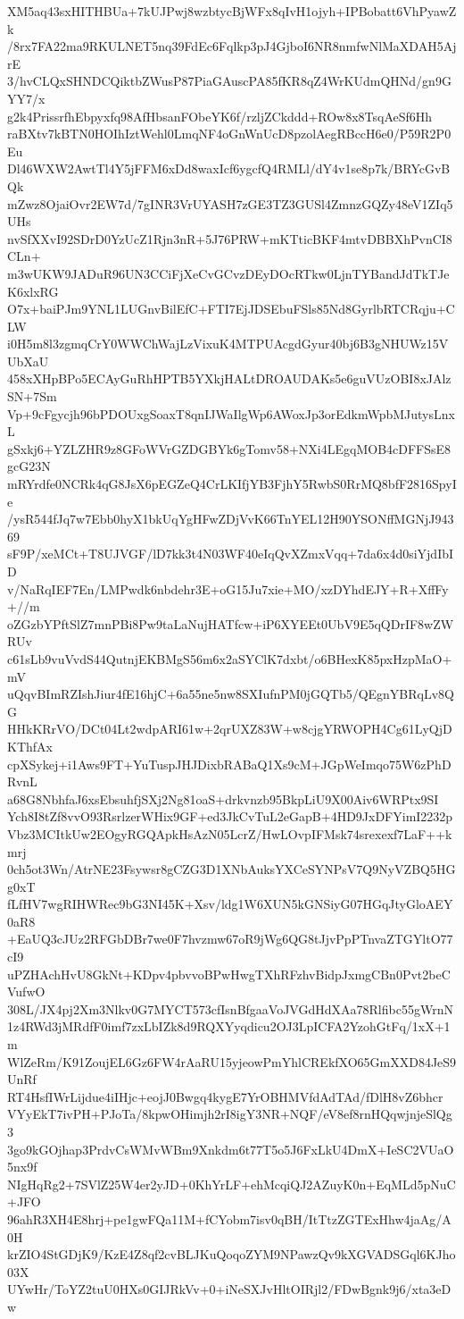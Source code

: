 XM5aq43sxHITHBUa+7kUJPwj8wzbtycBjWFx8qIvH1ojyh+IPBobatt6VhPyawZk
/8rx7FA22ma9RKULNET5nq39FdEc6Fqlkp3pJ4GjboI6NR8nmfwNlMaXDAH5AjrE
3/hvCLQxSHNDCQiktbZWusP87PiaGAuscPA85fKR8qZ4WrKUdmQHNd/gn9GYY7/x
g2k4PrissrfhEbpyxfq98AfHbsanFObeYK6f/rzljZCkddd+ROw8x8TsqAeSf6Hh
raBXtv7kBTN0HOIhIztWehl0LmqNF4oGnWnUcD8pzolAegRBccH6e0/P59R2P0Eu
Dl46WXW2AwtTl4Y5jFFM6xDd8waxIcf6ygcfQ4RMLl/dY4v1se8p7k/BRYcGvBQk
mZwz8OjaiOvr2EW7d/7gINR3VrUYASH7zGE3TZ3GUSl4ZmnzGQZy48eV1ZIq5UHs
nvSfXXvI92SDrD0YzUcZ1Rjn3nR+5J76PRW+mKTticBKF4mtvDBBXhPvnCI8CLn+
m3wUKW9JADuR96UN3CCiFjXeCvGCvzDEyDOcRTkw0LjnTYBandJdTkTJeK6xlxRG
O7x+baiPJm9YNL1LUGnvBilEfC+FTI7EjJDSEbuFSls85Nd8GyrlbRTCRqju+CLW
i0H5m8l3zgmqCrY0WWChWajLzVixuK4MTPUAcgdGyur40bj6B3gNHUWz15VUbXaU
458xXHpBPo5ECAyGuRhHPTB5YXkjHALtDROAUDAKs5e6guVUzOBI8xJAlzSN+7Sm
Vp+9cFgycjh96bPDOUxgSoaxT8qnIJWaIlgWp6AWoxJp3orEdkmWpbMJutysLnxL
gSxkj6+YZLZHR9z8GFoWVrGZDGBYk6gTomv58+NXi4LEgqMOB4cDFFSsE8gcG23N
mRYrdfe0NCRk4qG8JsX6pEGZeQ4CrLKIfjYB3FjhY5RwbS0RrMQ8bfF2816SpyIe
/ysR544fJq7w7Ebb0hyX1bkUqYgHFwZDjVvK66TnYEL12H90YSONffMGNjJ94369
sF9P/xeMCt+T8UJVGF/lD7kk3t4N03WF40eIqQvXZmxVqq+7da6x4d0siYjdIbID
v/NaRqIEF7En/LMPwdk6nbdehr3E+oG15Ju7xie+MO/xzDYhdEJY+R+XffFy+//m
oZGzbYPftSlZ7mnPBi8Pw9taLaNujHATfcw+iP6XYEEt0UbV9E5qQDrIF8wZWRUv
c61sLb9vuVvdS44QutnjEKBMgS56m6x2aSYClK7dxbt/o6BHexK85pxHzpMaO+mV
uQqvBImRZIshJiur4fE16hjC+6a55ne5nw8SXIufnPM0jGQTb5/QEgnYBRqLv8QG
HHkKRrVO/DCt04Lt2wdpARI61w+2qrUXZ83W+w8cjgYRWOPH4Cg61LyQjDKThfAx
cpXSykej+i1Aws9FT+YuTuspJHJDixbRABaQ1Xs9cM+JGpWeImqo75W6zPhDRvnL
a68G8NbhfaJ6xsEbsuhfjSXj2Ng81oaS+drkvnzb95BkpLiU9X00Aiv6WRPtx9SI
Ych8I8tZf8vvO93RsrlzerWHix9GF+ed3JkCvTuL2eGapB+4HD9JxDFYimI2232p
Vbz3MCItkUw2EOgyRGQApkHsAzN05LcrZ/HwLOvpIFMsk74srexexf7LaF++kmrj
0ch5ot3Wn/AtrNE23Fsywsr8gCZG3D1XNbAuksYXCeSYNPsV7Q9NyVZBQ5HGg0xT
fLfHV7wgRIHWRec9bG3NI45K+Xsv/ldg1W6XUN5kGNSiyG07HGqJtyGloAEY0aR8
+EaUQ3cJUz2RFGbDBr7we0F7hvzmw67oR9jWg6QG8tJjvPpPTnvaZTGYltO77cI9
uPZHAchHvU8GkNt+KDpv4pbvvoBPwHwgTXhRFzhvBidpJxmgCBn0Pvt2beCVufwO
308L/JX4pj2Xm3Nlkv0G7MYCT573cfIsnBfgaaVoJVGdHdXAa78Rlfibc55gWrnN
1z4RWd3jMRdfF0imf7zxLbIZk8d9RQXYyqdicu2OJ3LpICFA2YzohGtFq/1xX+1m
WlZeRm/K91ZoujEL6Gz6FW4rAaRU15yjeowPmYhlCREkfXO65GmXXD84JeS9UnRf
RT4HsfIWrLijdue4iIHjc+eojJ0Bwgq4kygE7YrOBHMVfdAdTAd/fDlH8vZ6bhcr
VYyEkT7ivPH+PJoTa/8kpwOHimjh2rI8igY3NR+NQF/eV8ef8rnHQqwjnjeSlQg3
3go9kGOjhap3PrdvCsWMvWBm9Xnkdm6t77T5o5J6FxLkU4DmX+IeSC2VUaO5nx9f
NIgHqRg2+7SVlZ25W4er2yJD+0KhYrLF+ehMcqiQJ2AZuyK0n+EqMLd5pNuC+JFO
96ahR3XH4E8hrj+pe1gwFQa11M+fCYobm7isv0qBH/ItTtzZGTExHhw4jaAg/A0H
krZIO4StGDjK9/KzE4Z8qf2cvBLJKuQoqoZYM9NPawzQv9kXGVADSGql6KJho03X
UYwHr/ToYZ2tuU0HXs0GIJRkVv+0+iNeSXJvHltOIRjl2/FDwBgnk9j6/xta3eDw
